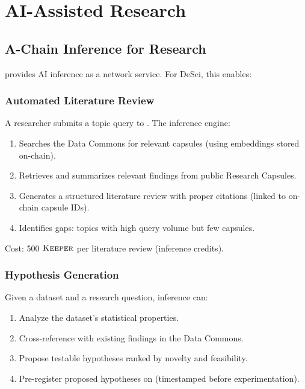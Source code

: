 \section{AI-Assisted Research}

\label{sec:ai}

\subsection{A-Chain Inference for Research}

\Zoo{} \AChain{} provides AI inference as a network service. For DeSci, this enables:

\subsubsection{Automated Literature Review}

A researcher submits a topic query to \AChain{}. The inference engine:

\begin{enumerate}
    \item Searches the Data Commons for relevant capsules (using embeddings stored on-chain).
    \item Retrieves and summarizes relevant findings from public Research Capsules.
    \item Generates a structured literature review with proper citations (linked to on-chain capsule IDs).
    \item Identifies gaps: topics with high query volume but few capsules.
\end{enumerate}

Cost: 500 $\textsc{Keeper}$ per literature review (inference credits).

\subsubsection{Hypothesis Generation}

Given a dataset and a research question, \AChain{} inference can:

\begin{enumerate}
    \item Analyze the dataset's statistical properties.
    \item Cross-reference with existing findings in the Data Commons.
    \item Propose testable hypotheses ranked by novelty and feasibility.
    \item Pre-register proposed hypotheses on \IChain{} (timestamped before experimentation).
\end{enumerate}

